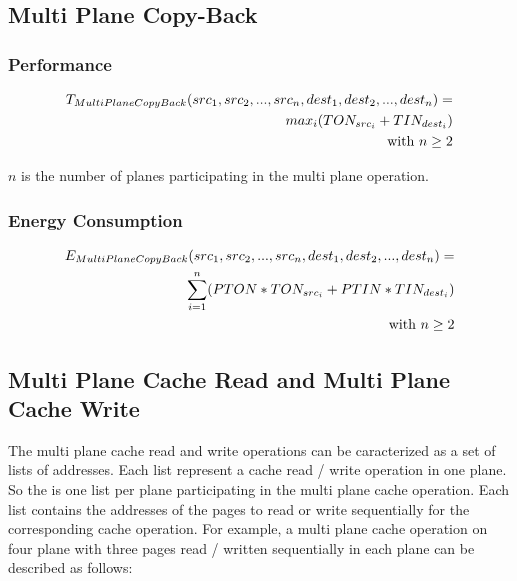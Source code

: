 \documentclass[oneside]{memoir}
\begin{document}
\subsection{Multi Plane Copy-Back}

\subsubsection{Performance}

\begin{align}
T_{MultiPlaneCopyBack}(src_1, src_2, ... , src_n, dest_1, dest_2, ... , dest_n) = 
\notag\\max_i (TON_{src_i} + TIN_{dest_i})
\notag\\\text{with } n \ge 2
\end{align}

$n$ is the number of planes participating in the multi plane operation.

\subsubsection{Energy Consumption}

\begin{align}
E_{MultiPlaneCopyBack}(src_1, src_2, ... , src_n, dest_1, dest_2, ... , dest_n) = 
\notag\\\sum\limits_{i=1}^{n} (PTON*TON_{src_i} + PTIN*TIN_{dest_i})
\notag\\\text{with } n \ge 2
\end{align}

\subsection{Multi Plane Cache Read and Multi Plane Cache Write}

The multi plane cache read and write operations can be caracterized as a set of lists of addresses. Each list represent a cache read / write operation in one plane. So the is one list per plane participating in the multi plane cache operation. Each list contains the addresses of the pages to read or write sequentially for the corresponding cache operation. For example, a multi plane cache operation on four plane with three pages read / written sequentially in each plane can be described as follows:
\begin{align} [ addr_{1,1}, addr_{1,2}, addr_{1,3}, addr_{2,1}, addr_{2,2}, addr_{2,3}, addr_{3,1}, 
\notag\\addr_{3,2}, addr_{3,3}, addr_{4,1}, addr_{4,2}, addr_{4,3} ] \end{align}
\end{document}
